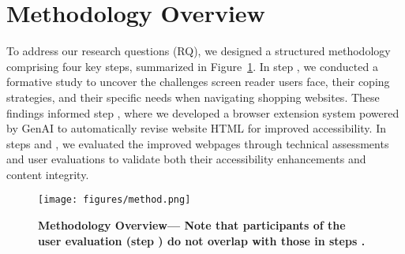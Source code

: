 \section{Methodology Overview}

To address our research questions (RQ), we designed a structured methodology comprising four key steps, summarized in Figure~\ref{fig:method}. In step , we conducted a formative study to uncover the challenges screen reader users face, their coping strategies, and their specific needs when navigating shopping websites. These findings informed step , where we developed a browser extension system powered by GenAI to automatically revise website HTML for improved accessibility. In steps  and , we evaluated the improved webpages through technical assessments and user evaluations to validate both their accessibility enhancements and content integrity.

\begin{figure}[h]
\centering
\texttt{[image: figures/method.png]}
\caption[A flowchart depicting the four main steps of the study methodology. Step 1: Formative study to identify challenges, coping strategies, and needs of screen reader users navigating shopping websites. Step 2: Development of a browser extension system powered by GenAI to automatically revise website HTML for improved accessibility. Step 3: Technical assessments to evaluate accessibility improvements and content integrity of the revised webpages. Step 4: User evaluations to validate accessibility enhancements and gather qualitative feedback. Arrows connect the steps sequentially, showing the flow from formative research to development, technical assessment, and user validation.]{
\textbf{Methodology Overview---%
    \textmd{{\small Note that participants of the user evaluation (step ) do not overlap with those in steps }. 
    }
 }
 }
\label{fig:method}
\vspace{-0.16in}
\end{figure}



